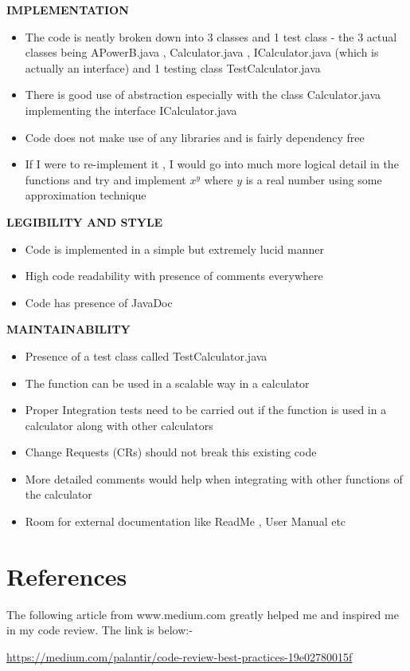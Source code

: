 \documentclass[12pt,letterpaper]{article}
\begin{document}
\textbf{IMPLEMENTATION}

\begin{itemize}
\item{The code is neatly broken down into 3 classes and 1 test class - the 3 actual classes being APowerB.java , Calculator.java , ICalculator.java  (which is actually an interface) and 1 testing class TestCalculator.java}
\item{There is good use of abstraction especially with the class Calculator.java implementing the interface ICalculator.java}
\item{Code does not make use of any libraries and is fairly dependency free}
\item{If I were to re-implement it , I would go into much more logical detail in the functions and try and implement $x^y$ where $y$ is a real number using some approximation technique}
\end{itemize}


\textbf{LEGIBILITY AND STYLE}

\begin{itemize}
\item{Code is implemented in a simple but extremely lucid manner}
\item{High code readability with presence of comments everywhere}
\item{Code has presence of JavaDoc}
\end{itemize}

\textbf{MAINTAINABILITY}

\begin{itemize}
\item{Presence of a test class called TestCalculator.java}
\item{The function can be used in a scalable way in a calculator}
\item{Proper Integration tests need to be carried out if the function is used in a calculator along with other calculators}
\item{Change Requests (CRs) should not break this existing code}
\item{More detailed comments would help when integrating with other functions of the calculator}
\item{Room for external documentation like ReadMe , User Manual etc}
\end{itemize}


\section*{References}

The following article from www.medium.com greatly helped me and inspired me in my code review.
The link is below:-

\url{https://medium.com/palantir/code-review-best-practices-19e02780015f}
\end{document}
